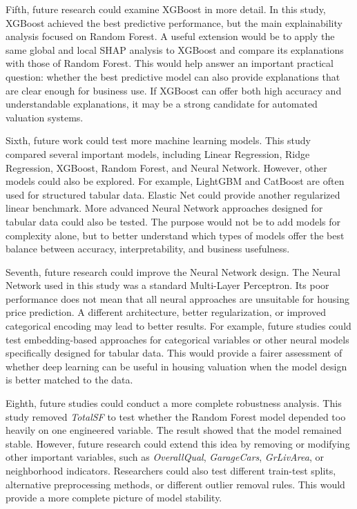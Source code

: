 \documentclass[12pt,a4paper,oneside,openany]{book}
\begin{document}
Fifth, future research could examine XGBoost in more detail. In this study, XGBoost achieved the best predictive performance, but the main explainability analysis focused on Random Forest. A useful extension would be to apply the same global and local SHAP analysis to XGBoost and compare its explanations with those of Random Forest. This would help answer an important practical question: whether the best predictive model can also provide explanations that are clear enough for business use. If XGBoost can offer both high accuracy and understandable explanations, it may be a strong candidate for automated valuation systems.

Sixth, future work could test more machine learning models. This study compared several important models, including Linear Regression, Ridge Regression, XGBoost, Random Forest, and Neural Network. However, other models could also be explored. For example, LightGBM and CatBoost are often used for structured tabular data. Elastic Net could provide another regularized linear benchmark. More advanced Neural Network approaches designed for tabular data could also be tested. The purpose would not be to add models for complexity alone, but to better understand which types of models offer the best balance between accuracy, interpretability, and business usefulness.

Seventh, future research could improve the Neural Network design. The Neural Network used in this study was a standard Multi-Layer Perceptron. Its poor performance does not mean that all neural approaches are unsuitable for housing price prediction. A different architecture, better regularization, or improved categorical encoding may lead to better results. For example, future studies could test embedding-based approaches for categorical variables or other neural models specifically designed for tabular data. This would provide a fairer assessment of whether deep learning can be useful in housing valuation when the model design is better matched to the data.

Eighth, future studies could conduct a more complete robustness analysis. This study removed \textit{TotalSF} to test whether the Random Forest model depended too heavily on one engineered variable. The result showed that the model remained stable. However, future research could extend this idea by removing or modifying other important variables, such as \textit{OverallQual}, \textit{GarageCars}, \textit{GrLivArea}, or neighborhood indicators. Researchers could also test different train-test splits, alternative preprocessing methods, or different outlier removal rules. This would provide a more complete picture of model stability.
\end{document}
